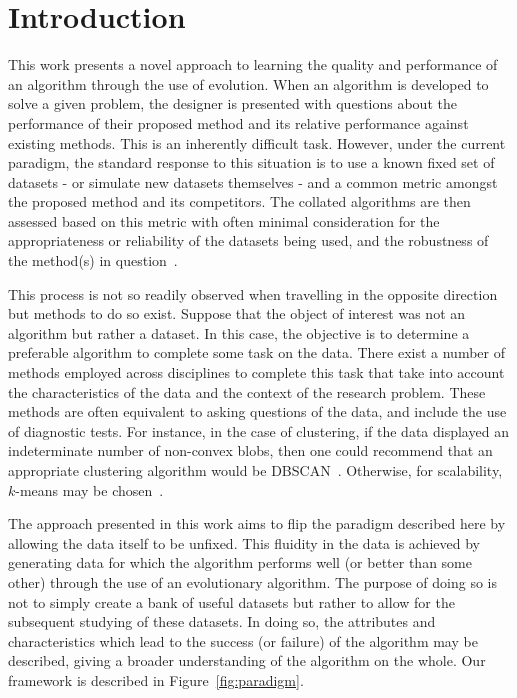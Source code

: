 \section{Introduction}\label{section:introduction}

This work presents a novel approach to learning the quality and performance of
an algorithm through the use of evolution. When an algorithm is developed to
solve a given problem, the designer is presented with questions about the
performance of their proposed method and its relative performance against
existing methods. This is an inherently difficult task. However, under the
current paradigm, the standard response to this situation is to use a known
fixed set of datasets \-- or simulate new datasets themselves \-- and a common
metric amongst the proposed method and its competitors. The collated algorithms
are then assessed based on this metric with often minimal consideration for
the appropriateness or reliability of the datasets being used, and the
robustness of the method(s) in question~\cite{Abualigah2018a,Huang1998,Liu2016}.

This process is not so readily observed when travelling in the opposite
direction but methods to do so exist. Suppose that the object of interest was
not an algorithm but rather a dataset. In this case, the objective is to
determine a preferable algorithm to complete some task on the data.  There exist
a number of methods employed across disciplines to complete this task that take
into account the characteristics of the data and the context of the research
problem. These methods are often equivalent to asking questions of the data, and
include the use of diagnostic tests. For instance, in the case of clustering, if
the data displayed an indeterminate number of non-convex blobs, then one could
recommend that an appropriate clustering algorithm would be
DBSCAN~\cite{Ester1996}. Otherwise, for scalability, \(k\)-means may be
chosen~\cite{Wu2009,Zhao2009}.

The approach presented in this work aims to flip the paradigm described here by
allowing the data itself to be unfixed. This fluidity in the data is achieved by
generating data for which the algorithm performs well (or better than some
other) through the use of an evolutionary algorithm. The purpose of doing so is
not to simply create a bank of useful datasets but rather to allow for the
subsequent studying of these datasets. In doing so, the attributes and
characteristics which lead to the success (or failure) of the algorithm may be
described, giving a broader understanding of the algorithm on the whole. Our
framework is described in Figure~\ref{fig:paradigm}.

